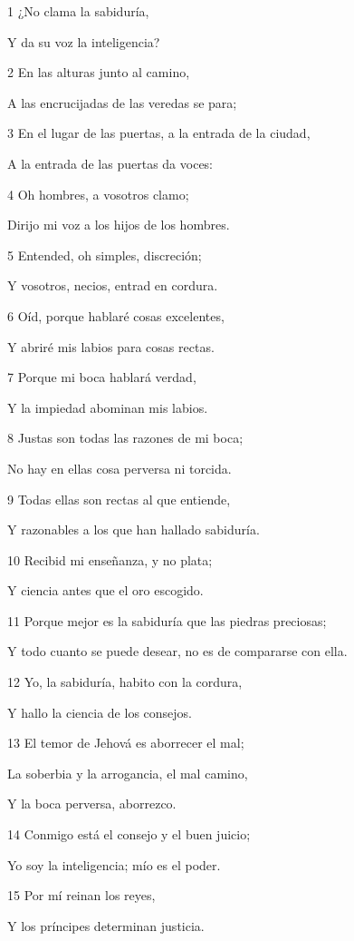 \par 1 ¿No clama la sabiduría,
\par Y da su voz la inteligencia?
\par 2 En las alturas junto al camino,
\par A las encrucijadas de las veredas se para;
\par 3 En el lugar de las puertas, a la entrada de la ciudad,
\par A la entrada de las puertas da voces: 
\par 4 Oh hombres, a vosotros clamo;
\par Dirijo mi voz a los hijos de los hombres.
\par 5 Entended, oh simples, discreción;
\par Y vosotros, necios, entrad en cordura.
\par 6 Oíd, porque hablaré cosas excelentes,
\par Y abriré mis labios para cosas rectas. 
\par 7 Porque mi boca hablará verdad,
\par Y la impiedad abominan mis labios.
\par 8 Justas son todas las razones de mi boca;
\par No hay en ellas cosa perversa ni torcida.
\par 9 Todas ellas son rectas al que entiende,
\par Y razonables a los que han hallado sabiduría.
\par 10 Recibid mi enseñanza, y no plata;
\par Y ciencia antes que el oro escogido.
\par 11 Porque mejor es la sabiduría que las piedras preciosas;
\par Y todo cuanto se puede desear, no es de compararse con ella.
\par 12 Yo, la sabiduría, habito con la cordura,
\par Y hallo la ciencia de los consejos.
\par 13 El temor de Jehová es aborrecer el mal;
\par La soberbia y la arrogancia, el mal camino,
\par Y la boca perversa, aborrezco.
\par 14 Conmigo está el consejo y el buen juicio;
\par Yo soy la inteligencia; mío es el poder.
\par 15 Por mí reinan los reyes,
\par Y los príncipes determinan justicia.
